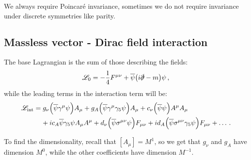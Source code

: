 \documentclass[main.tex]{subfiles}
\begin{document}
We always require Poincaré invariance, sometimes we do not require invariance under discrete symmetries like parity. 

\subsection{Massless vector - Dirac field interaction}

The base Lagrangian is the sum of those describing the fields: 
%
\begin{align}
\mathscr{L}_{0}
= - \frac{1}{4} F^{\mu \nu }
+ \overline{\psi} \qty(i \slashed{\partial} - m ) \psi 
\,,
\end{align}
%
while the leading terms in the interaction term will be: 
%
\begin{align}
\begin{split}
\mathscr{L} _{\text{int}}
&= g_{\nu } \qty(\overline{\psi} \gamma^{\mu } \psi ) A_{\mu }
+ g_{A} \qty(\overline{\psi} \gamma^{\mu } \gamma_{5} \psi )A_{\mu }
+ c_{\nu } \qty(\overline{\psi} \psi ) A^{\mu } A_{\mu } 
\\
&\phantom{=}\ 
+ i c_A \overline{\psi} \gamma_{5} \psi A_{\mu }A^{\mu }
+ d_{\nu } \qty(\overline{\psi} \sigma^{\mu \nu }\psi )F_{\mu \nu }
+ i d_A  \qty(\overline{\psi} \sigma^{\mu \nu } \gamma_5 \psi) F_{\mu\nu  } + \dots
\,.
\end{split}
\end{align}

To find the dimensionality, recall that \([A_{\mu }] = M^{1}\), so we get that \(g_\nu \) and \(g_A\) have dimension \(M^{0}\), while the other coefficients have dimension \(M^{-1}\). 
\end{document}
